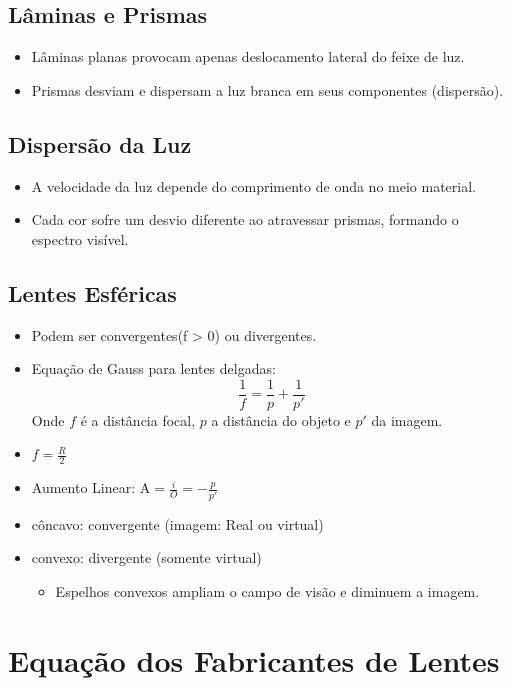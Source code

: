 \documentclass[a4paper,12pt]{article}
\begin{document}
\begin{multicols}{2}
\subsection{Lâminas e Prismas}
\begin{itemize}
    \item Lâminas planas provocam apenas deslocamento lateral do feixe de luz.
    \item Prismas desviam e dispersam a luz branca em seus componentes (dispersão).
\end{itemize}

\subsection{Dispersão da Luz}
\begin{itemize}
    \item A velocidade da luz depende do comprimento de onda no meio material.
    \item Cada cor sofre um desvio diferente ao atravessar prismas, formando o espectro visível.
\end{itemize}

\subsection{Lentes Esféricas}
\begin{itemize}
    \item Podem ser convergentes(f > 0) ou divergentes.
    \item Equação de Gauss para lentes delgadas:
    \[
        \frac{1}{f} = \frac{1}{p} + \frac{1}{p'}
    \]
    Onde $f$ é a distância focal, $p$ a distância do objeto e $p'$ da imagem.
    \item $f = \frac{R}{2}$
    \item Aumento Linear: A$ = \frac{i}{O} = -\frac{p}{p'}$
    \item c\^oncavo: convergente (imagem: Real ou virtual)
    \item convexo: divergente (somente virtual)
    \begin{itemize}
        \item Espelhos convexos ampliam o campo de visão e diminuem a imagem.
    \end{itemize}
\end{itemize}

\section{Equação dos Fabricantes de Lentes}


\end{multicols}
\end{document}
